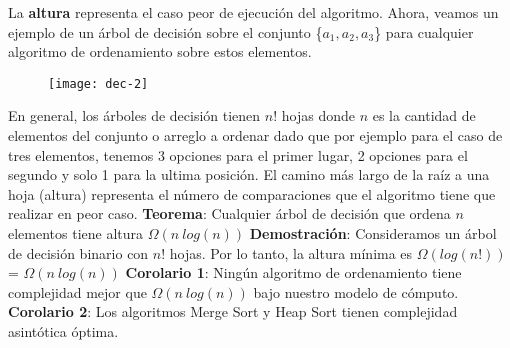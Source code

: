 \documentclass[10pt,a4paper]{article}
\begin{document}
\newline
\newline
La \textbf{altura} representa el caso peor de ejecución del algoritmo.
\newpage
Ahora, veamos un ejemplo de un árbol de decisión sobre el conjunto \{$a_{1},a_{2},a_{3}$\} para cualquier algoritmo de ordenamiento sobre estos elementos.
\newline
\newline
\begin{figure}[h]
	\centering
\texttt{[image: dec-2]}
	\label{drivers1}
\end{figure}
\newline
\newline
En general, los árboles de decisión tienen $n!$ hojas donde $n$ es la cantidad de elementos del conjunto o arreglo a ordenar dado que por ejemplo para el caso de tres elementos, tenemos 3 opciones para el primer lugar, 2 opciones para el segundo y solo 1 para la ultima posición.
\newline
\newline
El camino más largo de la raíz a una hoja (altura) representa el número de comparaciones que el algoritmo tiene que realizar en peor caso.
\newline
\newline
\textbf{Teorema}: Cualquier árbol de decisión que ordena $n$ elementos tiene altura $\Omega(n~log(n))$ 
\newline
\newline
\textbf{Demostración}: Consideramos un árbol de decisión binario con $n!$ hojas. Por lo tanto, la altura mínima es $\Omega(log(n!))$ = $\Omega(n~log(n))$ 
\newline
\newline
\textbf{Corolario 1}: Ningún algoritmo de ordenamiento tiene complejidad mejor que $\Omega(n~log(n))$ bajo nuestro modelo de cómputo.
\newline
\newline
\textbf{Corolario 2}: Los algoritmos Merge Sort y Heap Sort tienen complejidad asintótica óptima. 
\end{document}

